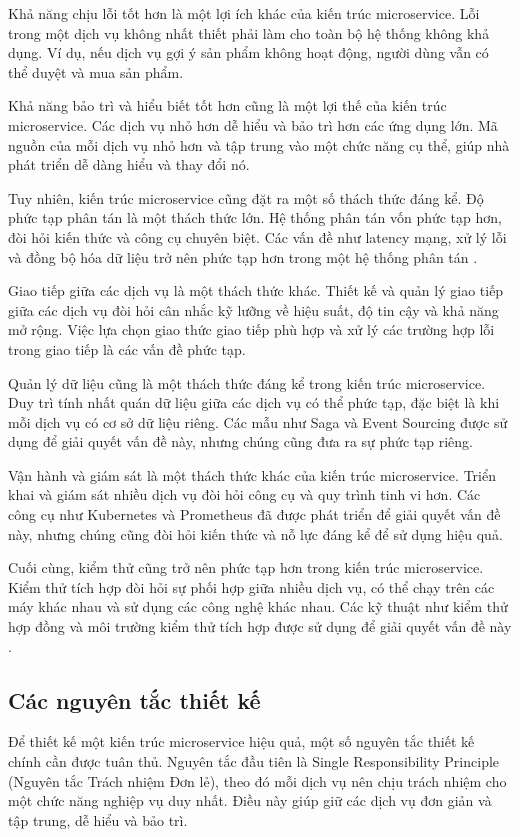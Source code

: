 Khả năng chịu lỗi tốt hơn là một lợi ích khác của kiến trúc microservice. Lỗi
trong một dịch vụ không nhất thiết phải làm cho toàn bộ hệ thống không khả
dụng. Ví dụ, nếu dịch vụ gợi ý sản phẩm không hoạt động, người dùng vẫn có thể
duyệt và mua sản phẩm.

Khả năng bảo trì và hiểu biết tốt hơn cũng là một lợi thế của kiến trúc
microservice. Các dịch vụ nhỏ hơn dễ hiểu và bảo trì hơn các ứng dụng lớn. Mã
nguồn của mỗi dịch vụ nhỏ hơn và tập trung vào một chức năng cụ thể, giúp nhà
phát triển dễ dàng hiểu và thay đổi nó.

Tuy nhiên, kiến trúc microservice cũng đặt ra một số thách thức đáng kể. Độ
phức tạp phân tán là một thách thức lớn. Hệ thống phân tán vốn phức tạp hơn,
đòi hỏi kiến thức và công cụ chuyên biệt. Các vấn đề như latency mạng, xử lý
lỗi và đồng bộ hóa dữ liệu trở nên phức tạp hơn trong một hệ thống phân tán \cite{newman2015}.

Giao tiếp giữa các dịch vụ là một thách thức khác. Thiết kế và quản lý giao
tiếp giữa các dịch vụ đòi hỏi cân nhắc kỹ lưỡng về hiệu suất, độ tin cậy và khả
năng mở rộng. Việc lựa chọn giao thức giao tiếp phù hợp và xử lý các trường hợp
lỗi trong giao tiếp là các vấn đề phức tạp.

Quản lý dữ liệu cũng là một thách thức đáng kể trong kiến trúc microservice.
Duy trì tính nhất quán dữ liệu giữa các dịch vụ có thể phức tạp, đặc biệt là
khi mỗi dịch vụ có cơ sở dữ liệu riêng. Các mẫu như Saga và Event Sourcing được
sử dụng để giải quyết vấn đề này, nhưng chúng cũng đưa ra sự phức tạp riêng.

Vận hành và giám sát là một thách thức khác của kiến trúc microservice. Triển
khai và giám sát nhiều dịch vụ đòi hỏi công cụ và quy trình tinh vi hơn. Các
công cụ như Kubernetes và Prometheus đã được phát triển để giải quyết vấn đề
này, nhưng chúng cũng đòi hỏi kiến thức và nỗ lực đáng kể để sử dụng hiệu quả.

Cuối cùng, kiểm thử cũng trở nên phức tạp hơn trong kiến trúc microservice.
Kiểm thử tích hợp đòi hỏi sự phối hợp giữa nhiều dịch vụ, có thể chạy trên các
máy khác nhau và sử dụng các công nghệ khác nhau. Các kỹ thuật như kiểm thử hợp
đồng và môi trường kiểm thử tích hợp được sử dụng để giải quyết vấn đề này \cite{newman2015}.

\subsection{Các nguyên tắc thiết kế}
Để thiết kế một kiến trúc microservice hiệu quả, một số nguyên tắc thiết kế chính cần được tuân thủ. Nguyên tắc đầu tiên là Single Responsibility Principle (Nguyên tắc Trách nhiệm Đơn lẻ), theo đó mỗi dịch vụ nên chịu trách nhiệm cho một chức năng nghiệp vụ duy nhất. Điều này giúp giữ các dịch vụ đơn giản và tập trung, dễ hiểu và bảo trì.

